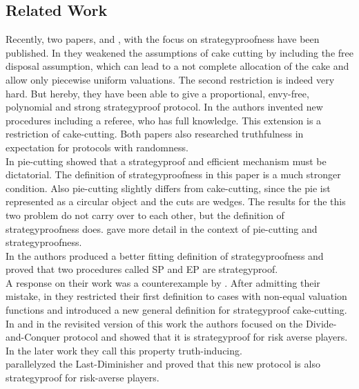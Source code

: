 \pagebreak
\subsection{Related Work}
Recently, two papers, \cite{chen:truth} and \cite{tamuz}, with the focus on strategyproofness have been published. In \cite{chen:truth} they weakened the assumptions of cake cutting by including the free disposal assumption, which can lead to a not complete allocation of the cake and allow only piecewise uniform valuations. The second restriction is indeed very hard. But hereby, they have been able to give a proportional, envy-free, polynomial and strong strategyproof protocol. In \cite{tamuz} the authors invented new procedures including a referee, who has full knowledge. This extension is a restriction of cake-cutting. Both papers also researched truthfulness in expectation for protocols with randomness.\\ \newline
In pie-cutting \cite{why} showed that a strategyproof and efficient mechanism must be dictatorial. The definition of strategyproofness in this paper is a much stronger condition. Also pie-cutting slightly differs from cake-cutting, since the pie ist represented as a circular object and the cuts are wedges. The results for the this two problem do not carry over to each other, but the definition of strategyproofness does. \cite{pie} gave more detail in the context of pie-cutting and strategyproofness. \\
\newline
In \cite{brams} the authors produced a better fitting definition of strategyproofness and proved that two procedures called SP and EP are strategyproof.\\ A response on their work was a counterexample by \cite{ccc}. After admitting their mistake, in \cite{note} they restricted their first definition to cases with non-equal valuation functions and introduced a new general definition for strategyproof cake-cutting.\\
In \cite{dc} and in the revisited version of this work \cite{dc2} the authors focused on the Divide-and-Conquer protocol and showed that it is strategyproof for risk averse players. In the later work they call this property truth-inducing. \\ \cite{lindner:degrees} parallelyzed the Last-Diminisher and proved that this new protocol is also strategyproof for risk-averse players. \pagebreak
